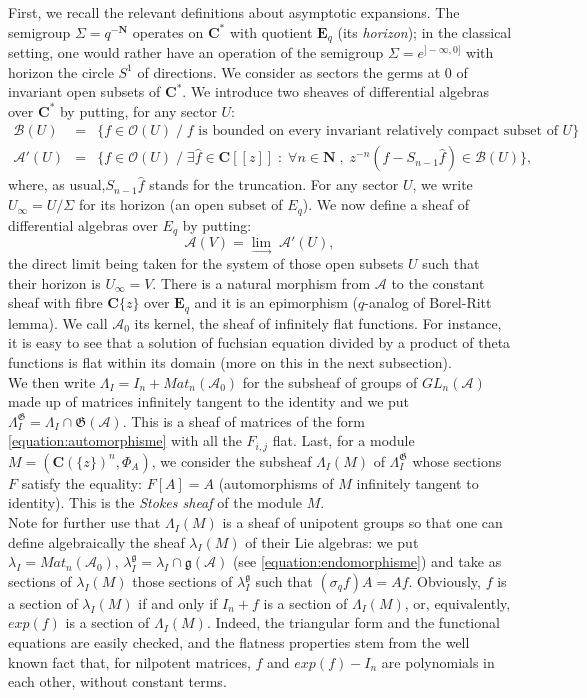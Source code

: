 \documentclass[english]{smfart}
\numberwithin{equation}{thm}
\def\sq{\sigma_q}
\def\C{{\mathbf C}}
\def\N{{\mathbf N}}
\def\B{{\mathcal{B}}}
\def\A{{\mathcal{A}}}
\def\O{{\mathcal{O}}}
\def\Eq{{\mathbf{E}_{q}}}
\def\G{{\mathfrak{G}}}
\def\g{{\mathfrak{g}}}
\def\Ra{{\C\{z\}}}
\def\Ka{{\C(\{z\})}}
\def\Rf{{\C[[z]]}}
\def\l{\left}
\def\r{\right}
\def\la{\lambda}
\def\La{\Lambda}
\begin{document}
First, we recall the relevant definitions about asymptotic expansions.
The semigroup $\Sigma = q^{-\N}$ operates on $\C^{*}$ with quotient $\Eq$
(its \emph{horizon}); in the classical setting, one would rather have 
an operation of the semigroup $\Sigma = e^{]-\infty,0]}$ with horizon
the circle $S^{1}$ of directions. We consider as sectors the germs
at $0$ of invariant open subsets of $\C^{*}$. We introduce two sheaves
of differential algebras over $\C^{*}$ by putting, for any sector $U$:
\begin{eqnarray*}
\B(U) & = & \{f \in \O(U) \;/\; f 
\text{~is bounded on every invariant relatively compact subset of~}
U\} \\
\A'(U) & = & \{ f \in \O(U) \;/\; \exists \hat{f} \in \Rf \;:\;
\forall n \in \N \;,\; z^{-n}\l(f - S_{n-1} \hat{f}\r) \in \B(U)\},
\end{eqnarray*}
where, as usual,$S_{n-1} \hat{f}$ stands for the truncation.
For any sector $U$, we write $U_{\infty} = U /\Sigma$ for its horizon 
(an open subset of $E_{q}$). We now define a sheaf of differential
algebras over $E_{q}$ by putting:
$$
\A(V) = \underset{\rightarrow}{\lim} \; \A'(U),
$$
the direct limit being taken for the system of those open subsets $U$
such that their horizon is $U_{\infty} = V$. There is a natural
morphism from $\A$ to the constant sheaf with fibre $\Ra$ over $\Eq$
and it is an epimorphism ($q$-analog of Borel-Ritt lemma). We call $\A_{0}$ 
its kernel, the sheaf of infinitely flat functions. For instance,
it is easy to see that a solution of fuchsian equation divided
by a product of theta functions is flat within its domain
(more on this in the next subsection). \\

We then write $\La_{I} = I_{n} + Mat_{n}(\A_{0})$ for the subsheaf
of groups of $GL_{n}(\A)$ made up of matrices infinitely tangent
to the identity and we put $\La_{I}^{\G} = \La_{I} \cap \G(\A)$.
This is a sheaf of matrices of the form \ref{equation:automorphisme}
with all the $F_{i,j}$ flat. 
Last, for a module $M = (\Ka^{n},\Phi_{A})$, we consider the subsheaf
$\La_{I}(M)$ of $\La_{I}^{\G}$ whose sections $F$ satisfy the equality: 
$F[A] = A$ (automorphisms of $M$ infinitely tangent to identity).
This is the \emph{Stokes sheaf} of the module $M$. \\

Note for further use that $\La_{I}(M)$ is a sheaf of unipotent
groups so that one can define algebraically the sheaf $\la_{I}(M)$
of their Lie algebras: we put $\la_{I} = Mat_{n}(\A_{0})$,
$\la_{I}^{\g} = \la_{I} \cap \g(\A)$ (see \ref{equation:endomorphisme})
and take as sections of $\la_{I}(M)$ those sections of $\la_{I}^{\g}$
such that $\l(\sq f\r) A = A f$. Obviously, $f$ is a section of
$\la_{I}(M)$ if and only if $I_{n} + f$ is a section of $\La_{I}(M)$,
or, equivalently, $exp(f)$ is a section of $\La_{I}(M)$. Indeed,
the triangular form and the functional equations are easily
checked, and the flatness properties stem from the well known
fact that, for nilpotent matrices, $f$ and $exp(f) - I_{n}$
are polynomials in each other, without constant terms. 
\end{document}
